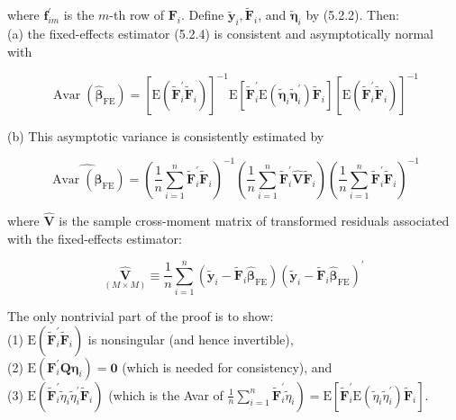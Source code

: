 \documentclass[10pt]{article}
\begin{document}
where $\mathbf{f}_{i m}^{\prime}$ is the $m$-th row of $\mathbf{F}_{i}$. Define $\tilde{\mathbf{y}}_{i}, \tilde{\mathbf{F}}_{i}$, and $\tilde{\boldsymbol{\eta}}_{i}$ by (5.2.2). Then:\\
(a) the fixed-effects estimator (5.2.4) is consistent and asymptotically normal with


\begin{equation*}
\operatorname{Avar}\left(\widehat{\boldsymbol{\beta}}_{\mathrm{FE}}\right)=\left[\mathrm{E}\left(\widetilde{\mathbf{F}}_{i}^{\prime} \widetilde{\mathbf{F}}_{i}\right)\right]^{-1} \mathrm{E}\left[\widetilde{\mathbf{F}}_{i}^{\prime} \mathrm{E}\left(\tilde{\boldsymbol{\eta}}_{i} \tilde{\boldsymbol{\eta}}_{i}^{\prime}\right) \widetilde{\mathbf{F}}_{i}\right]\left[\mathrm{E}\left(\widetilde{\mathbf{F}}_{i}^{\prime} \widetilde{\mathbf{F}}_{i}\right)\right]^{-1} \tag{5.2.7}
\end{equation*}


(b) This asymptotic variance is consistently estimated by


\begin{equation*}
\widehat{\operatorname{Avar}\left(\widehat{\boldsymbol{\beta}}_{\mathrm{FE}}\right)}=\left(\frac{1}{n} \sum_{i=1}^{n} \widetilde{\mathbf{F}}_{i}^{\prime} \widetilde{\mathbf{F}}_{i}\right)^{-1}\left(\frac{1}{n} \sum_{i=1}^{n} \widetilde{\mathbf{F}}_{i}^{\prime} \widehat{\mathbf{V}} \widetilde{\mathbf{F}}_{i}\right)\left(\frac{1}{n} \sum_{i=1}^{n} \widetilde{\mathbf{F}}_{i}^{\prime} \widetilde{\mathbf{F}}_{i}\right)^{-1} \tag{5.2.8}
\end{equation*}


where $\widehat{\mathbf{V}}$ is the sample cross-moment matrix of transformed residuals associated with the fixed-effects estimator:


\begin{equation*}
\underset{(M \times M)}{\widehat{\mathbf{V}}} \equiv \frac{1}{n} \sum_{i=1}^{n}\left(\tilde{\mathbf{y}}_{i}-\widetilde{\mathbf{F}}_{i} \widehat{\boldsymbol{\beta}}_{\mathrm{FE}}\right)\left(\tilde{\mathbf{y}}_{i}-\widetilde{\mathbf{F}}_{i} \widehat{\boldsymbol{\beta}}_{\mathrm{FE}}\right)^{\prime} \tag{5.2.9}
\end{equation*}


The only nontrivial part of the proof is to show:\\
(1) $\mathrm{E}\left(\widetilde{\mathbf{F}}_{i}^{\prime} \widetilde{\mathbf{F}}_{i}\right)$ is nonsingular (and hence invertible),\\
(2) $\mathrm{E}\left(\mathbf{F}_{i}^{\prime} \mathbf{Q} \boldsymbol{\eta}_{i}\right)=\mathbf{0}$ (which is needed for consistency), and\\
(3) $\mathrm{E}\left(\widetilde{\mathbf{F}}_{i}^{\prime} \tilde{\eta}_{i} \tilde{\eta}_{i}^{\prime} \widetilde{\mathbf{F}}_{i}\right)$ (which is the Avar of $\left.\frac{1}{n} \sum_{i=1}^{n} \widetilde{\mathbf{F}}_{i}^{\prime} \tilde{\eta}_{i}\right)=\mathrm{E}\left[\widetilde{\mathbf{F}}_{i}^{\prime} \mathrm{E}\left(\tilde{\eta}_{i} \tilde{\eta}_{i}^{\prime}\right) \widetilde{\mathbf{F}}_{i}\right]$.
\end{document}
